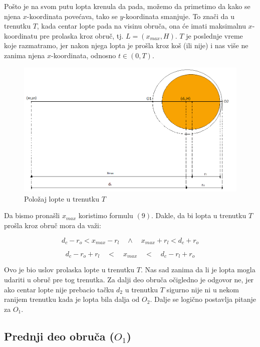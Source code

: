 \documentclass[a4paper, 12pt]{article}
\begin{document}
Pošto je na svom putu lopta krenula da pada, možemo da primetimo da kako se njena $x$-koordinata povećava, tako se $y$-koordinata smanjuje. To znači da u trenutku $T$, kada centar lopte pada na visinu obruča, ona će imati maksimalnu $x$-koordinatu pre prolaska kroz obruč, tj. $L = (x_{max},H)$. $T$ je poslednje vreme koje razmatramo, jer nakon njega lopta je prošla kroz koš (ili nije) i nas više ne zanima njena $x$-koordinata, odnosno $t \in (0,T)$.

\begin{figure}[h]
\hspace*{1.6cm}
\includegraphics[scale=0.3]{pic3}
\caption{Položaj lopte u trenutku $T$}
\end{figure}

 Da bismo pronašli $x_{max}$ koristimo formulu $(9)$. Dakle, da bi lopta u trenutku $T$ prošla kroz obruč mora da važi:

\[ d_c - r_o < x_{max} - r_l \quad \land \quad x_{max} + r_l < d_c + r_o \]

\begin{equation}
d_c - r_o + r_l \quad < \quad x_{max} \quad < \quad d_c - r_l + r_o
\end{equation}


Ovo je bio uslov prolaska lopte u trenutku $T$. Nas sad zanima da li je lopta mogla udariti u obruč pre tog trenutka. Za dalji deo obruča očigledno je odgovor ne, jer ako centar lopte nije prebacio tačku $d_2$ u trenutku $T$ sigurno nije ni u nekom ranijem trenutku kada je lopta bila dalja od $O_2$. Dalje se logično postavlja pitanje za $O_1$.



\subsection{Prednji deo obruča ($O_1$)}
\end{document}
